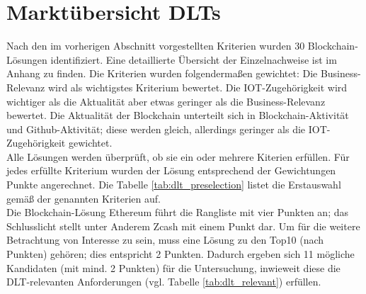 %
%
\section{Marktübersicht DLTs}
\label{sec:dlt_selection:market}
Nach den im vorherigen Abschnitt vorgestellten Kriterien wurden 30 Blockchain-Lösungen identifiziert. Eine detaillierte Übersicht der Einzelnachweise ist im Anhang zu finden. Die Kriterien wurden folgendermaßen gewichtet: Die Business-Relevanz wird als wichtigstes Kriterium bewertet. Die IOT-Zugehörigkeit wird wichtiger als die Aktualität aber etwas geringer als die Business-Relevanz bewertet. Die Aktualität der Blockchain unterteilt sich in Blockchain-Aktivität und Github-Aktivität; diese werden gleich, allerdings geringer als die IOT-Zugehörigkeit gewichtet.\\
Alle Lösungen werden überprüft, ob sie ein oder mehrere Kiterien erfüllen. Für jedes erfüllte Kriterium wurden der Lösung entsprechend der Gewichtungen Punkte angerechnet. Die Tabelle \ref{tab:dlt_preselection} listet die Erstauswahl gemäß der genannten Kriterien auf.\\
Die Blockchain-Lösung Ethereum führt die Rangliste mit vier Punkten an; das Schlusslicht stellt unter Anderem Zcash mit einem Punkt dar. Um für die weitere Betrachtung von Interesse zu sein, muss eine Lösung zu den Top10 (nach Punkten) gehören; dies entspricht 2 Punkten. Dadurch ergeben sich 11 mögliche Kandidaten (mit mind. 2 Punkten) für die Untersuchung, inwieweit diese die \ac{DLT}-relevanten Anforderungen (vgl. Tabelle \ref{tab:dlt_relevant}) erfüllen.

